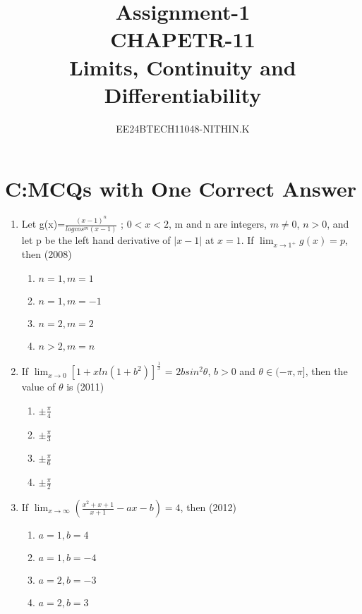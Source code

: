 \documentclass[journal,12pt,twocolumn]{IEEEtran}
\theoremstyle{remark}
\begin{document}


\title{Assignment-1\\CHAPETR-11\\Limits, Continuity and Differentiability}
\author{EE24BTECH11048-NITHIN.K} 
\maketitle
\newpage
\bigskip

\renewcommand{\thefigure}{\theenumi}
\renewcommand{\thetable}{\theenumi}


\section{C:MCQs with One Correct Answer}


\begin{enumerate}
\item Let g(x)=$\frac{(x-1)^n}{logcos^m(x-1)}$ ; $0<x<2$, m and n are integers, $m\neq0$, $n>0$, and let p be the left hand derivative of $|x-1|$ at $x=1$. If $\lim_{x \to 1^+}{g(x)=p}$, then \hfill{(2008)} 

\begin{enumerate}[label=\alph*)]
    \item $n=1,m=1$
    \item $n=1,m=-1$
    \item $n=2,m=2$
    \item $n>2,m=n$ \\
\end{enumerate}
\item If $\lim_{x \to 0}[1+xln(1+b^2)]^\frac{1}{x}$ = $2bsin^2\theta$, $b>0$ and $\theta \in (-\pi,\pi]$, then the value of $\theta$ is 
\hfill{(2011)} 

\begin{enumerate}[label=\alph*)]
    \item $\pm\frac{\pi}{4}$
    \item $\pm\frac{\pi}{3}$
    \item $\pm\frac{\pi}{6}$
    \item $\pm\frac{\pi}{2}$ \\
\end{enumerate} 
\item If $\lim_{ x \to \infty}(\frac{x^2+x+1}{x+1}-ax-b) = 4$, then \hfill{(2012)} 

\begin{enumerate}[label=\alph*)]
    \item $a=1,b=4$
    \item $a=1,b=-4$
    \item $a=2,b=-3$
    \item $a=2,b=3$ \\
\end{enumerate}


\end{enumerate}
\end{document}
